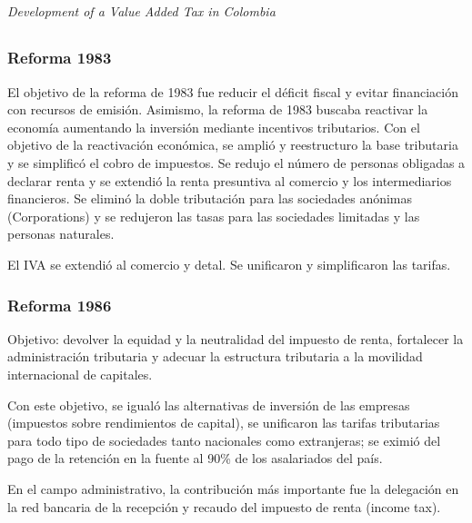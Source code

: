 \documentclass[
  12pt]{article}
\theoremstyle{definition}
\theoremstyle{remark}
\begin{document}
\subsection{\texorpdfstring{\citet{Perry1987}}{@Perry1987}}\label{perry1987}

\emph{Development of a Value Added Tax in Colombia}

\subsection{\texorpdfstring{\citet{Sanchez1994}}{@Sanchez1994}}\label{sanchez1994}

\subsubsection{Reforma 1983}\label{reforma-1983}

El objetivo de la reforma de 1983 fue reducir el déficit fiscal y evitar
financiación con recursos de emisión. Asimismo, la reforma de 1983
buscaba reactivar la economía aumentando la inversión mediante
incentivos tributarios. Con el objetivo de la reactivación económica, se
amplió y reestructuro la base tributaria y se simplificó el cobro de
impuestos. Se redujo el número de personas obligadas a declarar renta y
se extendió la renta presuntiva al comercio y los intermediarios
financieros. Se eliminó la doble tributación para las sociedades
anónimas (Corporations) y se redujeron las tasas para las sociedades
limitadas y las personas naturales.

El IVA se extendió al comercio y detal. Se unificaron y simplificaron
las tarifas.

\subsubsection{Reforma 1986}\label{reforma-1986}

Objetivo: devolver la equidad y la neutralidad del impuesto de renta,
fortalecer la administración tributaria y adecuar la estructura
tributaria a la movilidad internacional de capitales.

Con este objetivo, se igualó las alternativas de inversión de las
empresas (impuestos sobre rendimientos de capital), se unificaron las
tarifas tributarias para todo tipo de sociedades tanto nacionales como
extranjeras; se eximió del pago de la retención en la fuente al 90\% de
los asalariados del país.

En el campo administrativo, la contribución más importante fue la
delegación en la red bancaria de la recepción y recaudo del impuesto de
renta (income tax).
\end{document}
